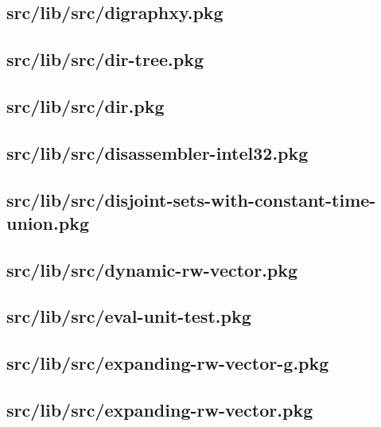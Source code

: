 \subsection{src/lib/src/digraphxy.pkg}


\subsection{src/lib/src/dir-tree.pkg}


\subsection{src/lib/src/dir.pkg}


\subsection{src/lib/src/disassembler-intel32.pkg}


\subsection{src/lib/src/disjoint-sets-with-constant-time-union.pkg}


\subsection{src/lib/src/dynamic-rw-vector.pkg}


\subsection{src/lib/src/eval-unit-test.pkg}


\subsection{src/lib/src/expanding-rw-vector-g.pkg}


\subsection{src/lib/src/expanding-rw-vector.pkg}


